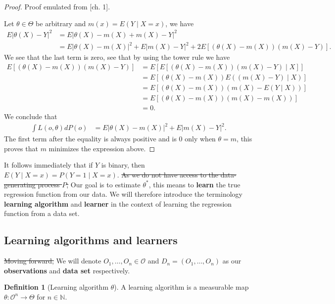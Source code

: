 \documentclass[11pt, a4paper]{article}
\theoremstyle{definition}
\newtheorem{definition}[theorem]{Definition}
\theoremstyle{remark}
\newcommand{\btheta}{\theta}
\begin{document}
\begin{proof}
    Proof emulated from \parencite{gyorfi2002distribution}[ch. 1]. 

    Let $ \btheta \in \Theta $ be arbitrary and $ m(x) = E(Y \mid X = x) $, we have 
    \begin{align*}
        E| \theta(X) - Y |^2 &= E| \theta(X) - m(X) + m(X) - Y |^2 \\
                             &= E| \theta(X) - m(X) |^2 + E| m(X) - Y |^2 + 2 E[ (\theta(X) - m(X))(m(X) - Y) ].
    \end{align*}
    We see that the last term is zero, see that by using the tower rule we have 
    \begin{align*}
        E[ (\theta(X) - m(X))(m(X) - Y) ] &= E[ E[ (\theta(X) - m(X))(m(X) - Y) \mid X] ] \\
                                                       &= E[ (\theta(X) - m(X)) E( (m(X) - Y) \mid X) ] \\
                                                       &= E[ (\theta(X) - m(X)) ( m(X) - E(Y \mid X)) ] \\
                                                       &= E[ (\theta(X) - m(X)) ( m(X) - m(X)) ] \\
                                                       &= 0.
    \end{align*}
    We conclude that 
    \begin{align*}
        \int L(o, \theta) d P(o) &= E| \theta(X) - m(X) |^2 + E | m(X) - Y |^2.
    \end{align*}
    The first term after the equality is always positive and is $ 0 $ only when $ \theta = m $, this proves that $ m $ minimizes the expression above. 
\end{proof}
It follows immediately that if $ Y $ is binary, then
$ E(Y \mid X = x) = P(Y = 1 \mid X = x) $. \sout{As we do not have
  access to the data-generating process $ P $, } Our goal is to
estimate $ \btheta^{*} $, this means to \textbf{learn} the true
regression function from our data.  We will therefore introduce the
terminology \textbf{learning algorithm} and \textbf{learner} in the
context of learning the regression function from a data set.

\subsection{Learning algorithms and learners}
\sout{Moving forward, } We will denote $ O_1 , \dots , O_n \in \mathcal{O} $
and $ D_n = (O_1 , \dots , O_n) $ as our \textbf{observations} and
\textbf{data set} respectively.
\begin{definition}[Learning algorithm $ \btheta $] 
    A learning algorithm is a measurable map $ \btheta : \mathcal{O}^{n} \to \Theta $ for $ n \in \mathbb{N} $. 
\end{definition}
\end{document}
